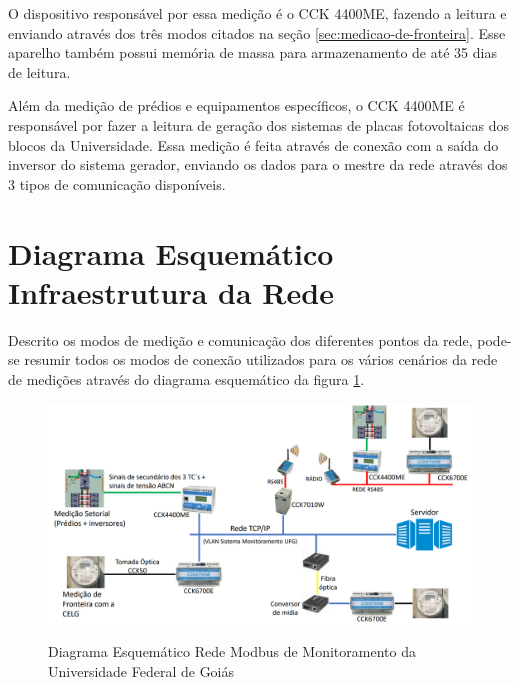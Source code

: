 O dispositivo responsável por essa medição é o CCK 4400ME, fazendo a leitura e enviando através dos três modos citados na seção \ref{sec:medicao-de-fronteira}. Esse aparelho também possui memória de massa para armazenamento de até 35 dias de leitura.

Além da medição de prédios e equipamentos específicos, o CCK 4400ME é responsável por fazer a leitura de geração dos sistemas de placas fotovoltaicas dos blocos da Universidade. Essa medição é feita através de conexão com a saída do inversor do sistema gerador, enviando os dados para o mestre da rede através dos 3 tipos de comunicação disponíveis.

\section{Diagrama Esquemático Infraestrutura da Rede}

Descrito os modos de medição e comunicação dos diferentes pontos da rede, pode-se resumir todos os modos de conexão utilizados para os vários cenários da rede de medições através do diagrama esquemático da figura \ref{fig:diagrama-rede-ufg}.
\newline

\begin{figure}[H]
    \centering
    \caption{Diagrama Esquemático Rede Modbus de Monitoramento da Universidade Federal de Goiás}
    \includegraphics[width=\linewidth]{imagens/esquema-rede-modbus.png}
    \label{fig:diagrama-rede-ufg}
\end{figure}
